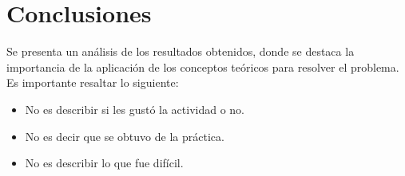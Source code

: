 \documentclass[letterpaper,12pt,oneside]{article}
\begin{document}
\section{Conclusiones}

Se presenta un análisis de los resultados obtenidos, donde se destaca la importancia de la aplicación de los conceptos teóricos para resolver el problema. Es importante resaltar lo siguiente:

\begin{itemize}
    \item No es describir si les gustó la actividad o no.
    \item No es decir que se obtuvo de la práctica.
    \item No es describir lo que fue difícil.
\end{itemize}

\printbibliography
\end{document}
